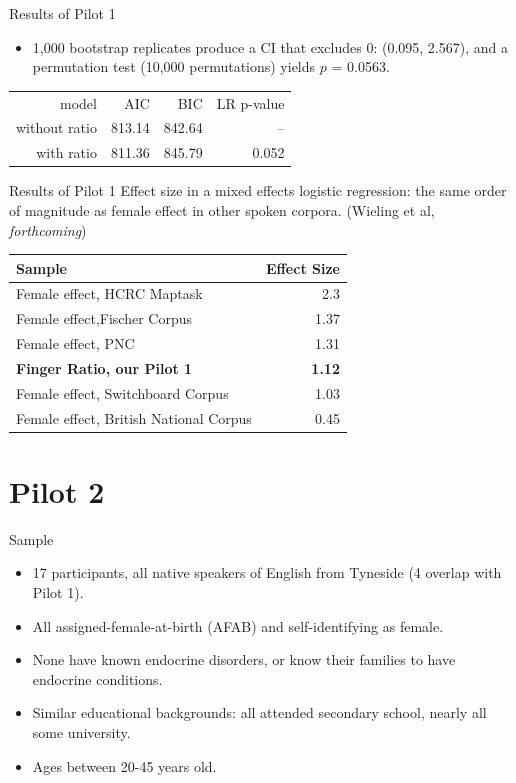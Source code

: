 \documentclass[hyperref={pdfpagelabels=false}]{beamer}
\begin{document}
\begin{frame}{Results of Pilot 1}
\begin{itemize}
\item 1,000 bootstrap replicates produce a CI that excludes 0: (0.095,  2.567), and a permutation test (10,000 permutations) yields $p$ = 0.0563.
\end{itemize}
\begin{center}
\begin{tabular}{rrrr}
\toprule
	model & AIC & BIC & LR p-value\\
	\cmidrule{2-4}
without ratio & 813.14 & 842.64 & -- \\
with ratio &  811.36 & 845.79 & 0.052\\
\bottomrule
\end{tabular}
\end{center}

\end{frame}


\begin{frame}{Results of Pilot 1}
\noindent Effect size in a mixed effects logistic regression: the same order of magnitude as female effect in other spoken corpora. (Wieling et al, \textsl{forthcoming})
\begin{center}
\begin{tabular}{l r}
\toprule
\textbf{Sample} & \textbf{Effect Size}\\
\midrule
Female effect, HCRC Maptask & 2.3\\
Female effect,Fischer Corpus & 1.37\\
Female effect, PNC & 1.31\\
\textbf{Finger Ratio, our Pilot 1} & \textbf{1.12}\\
Female effect, Switchboard Corpus & 1.03\\
Female effect, British National Corpus & 0.45\\
\bottomrule
\end{tabular}
\end{center}

\end{frame}


\section{Pilot 2}


\begin{frame}{Sample}
\begin{itemize}
	\item 17 participants, all native speakers of English from Tyneside (4 overlap with Pilot 1).
	\item All assigned-female-at-birth (AFAB) and self-identifying as female.
	\item None have known endocrine disorders, or know their families to have endocrine conditions.
	\item Similar educational backgrounds: all attended secondary school, nearly all some university.
	\item Ages between 20-45 years old.
\end{itemize}
\end{frame}
\end{document}
